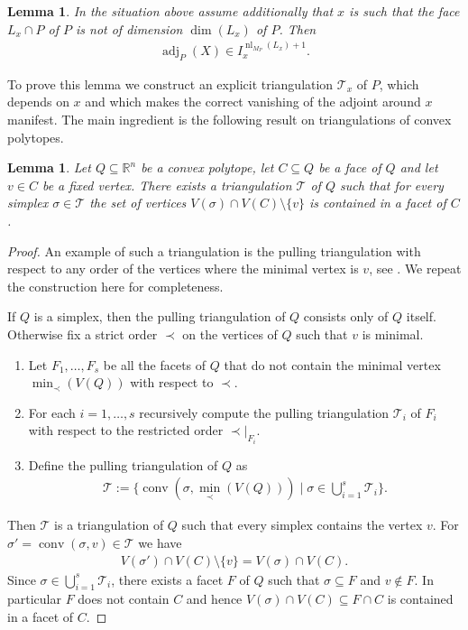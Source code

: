 \documentclass[a4paper,10pt]{amsart}
\theoremstyle{definition}
\theoremstyle{plain}
\newtheorem{lem}[defin]{Lemma}
\newcommand{\conv}{\operatorname{conv}}
\newcommand{\adj}{\operatorname{adj}} %
\newcommand{\nl}{\operatorname{nl}}
\newcommand{\cT}{{\mathcal T}}
\newcommand{\R}{{\mathbb R}}
\begin{document}
\begin{lem}
\label{lem:existence_strong_vanishing}
    In the situation above assume additionally that $x$ is such that the face $L_x\cap P$ of $P$ is not of dimension $\dim(L_x)$ of $P$. Then \begin{align*}
        \adj_P(X)\in I_x^{\nl_{M_P}(L_x)+1}.
    \end{align*}
\end{lem}
To prove this lemma we construct an explicit triangulation $\cT_x$ of $P$, which depends on $x$ and which makes the correct vanishing of the adjoint around $x$ manifest. The main ingredient is the following result on triangulations of convex polytopes.
\begin{lem}
\label{lem:costructing_triangulations}
Let $Q\subseteq \R^n$ be a convex polytope, let $C\subseteq Q$ be a face of $Q$ and let $v\in C$ be a fixed vertex. There exists a triangulation $\cT$ of $Q$ such that for every simplex $\sigma \in \cT$ the set of vertices $V(\sigma)\cap V(C)\setminus \{v\}$ is contained in a facet of $C$.
\end{lem}
\begin{proof} 
  An example of such a triangulation is the pulling triangulation with respect to any order of the vertices where the minimal vertex is $v$, see \cite[Section 3]{Manecke2020}. We repeat the construction here for completeness.

  If $Q$ is a simplex, then the pulling triangulation of $Q$ consists only of $Q$ itself.
  Otherwise fix a strict order $\prec$ on the vertices of $Q$ such that $v$ is minimal. \begin{enumerate}
      \item Let $F_1,\ldots,F_s$ be all the facets of $Q$ that do not contain the minimal vertex $\min_\prec(V(Q))$ with respect to $\prec$.
      \item For each $i=1,\ldots,s$ recursively compute the pulling triangulation $\cT_i$ of $F_i$ with respect to the restricted order $\prec|_{F_i}$.
      \item Define the pulling triangulation of $Q$ as \begin{align*}
      \cT:=\{\conv(\sigma,\min_\prec(V(Q)))\mid \sigma \in \bigcup_{i=1}^s\cT_i\}.
  \end{align*}
  \end{enumerate}
Then $\cT$ is a triangulation of $Q$ such that every simplex contains the vertex $v$. For $\sigma'=\conv(\sigma, v) \in \cT$ we have \begin{align*}
      V(\sigma') \cap V(C)\setminus \{v\}= V(\sigma)\cap V(C).
  \end{align*}
  Since $\sigma \in \bigcup_{i=1}^s\cT_i$, there exists a facet $F$ of $Q$ such that $\sigma\subseteq F$ and $v\notin F$. In particular $F$ does not contain $C$ and hence $V(\sigma)\cap V(C)\subseteq F\cap C$ is contained in a facet of $C$.
\end{proof}
\end{document}
